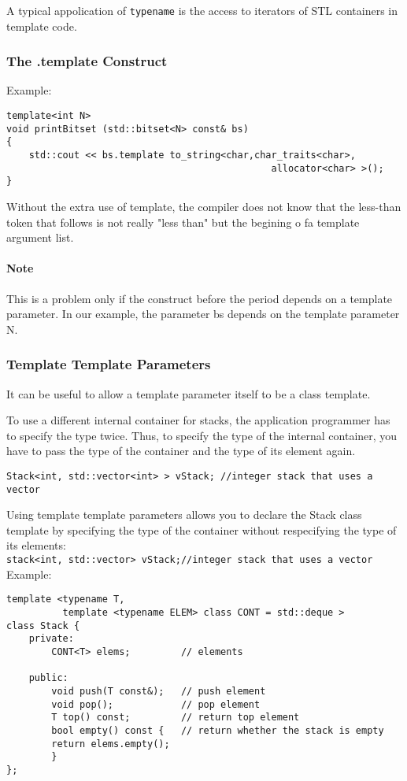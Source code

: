 \documentclass[11pt, a4paper]{book}
\begin{document}
A typical appolication of \verb|typename| is the access to iterators of STL containers in template code.

\subsubsection{The .template Construct}
Example:
\begin{verbatim}
template<int N> 
void printBitset (std::bitset<N> const& bs) 
{ 
    std::cout << bs.template to_string<char,char_traits<char>, 
	                                           allocator<char> >(); 
}
\end{verbatim}
Without the extra use of template, the compiler does not know that the less-than token that follows is not really "less than" but the begining o fa template argument list.
\paragraph{Note} This is a problem only if the construct before the period depends on a template parameter. In our example, the parameter bs depends on the template parameter N.
\subsubsection{Template Template Parameters}
It can be useful to allow a template parameter itself to be a class template. 

To use a different internal container for stacks, the application programmer has to specify the type twice. Thus, to specify the type of the internal container, you have to pass the type of the container and the type of its element again.
\begin{verbatim}
Stack<int, std::vector<int> > vStack; //integer stack that uses a vector
\end{verbatim}

Using template template parameters allows you to declare the Stack class template by specifying the type of the container without respecifying the type of its elements:\\
\verb|stack<int, std::vector> vStack;//integer stack that uses a vector|
Example:
\begin{verbatim}
template <typename T, 
          template <typename ELEM> class CONT = std::deque > 
class Stack { 
    private: 
        CONT<T> elems;         // elements 

    public: 
        void push(T const&);   // push element 
        void pop();            // pop element 
        T top() const;         // return top element 
        bool empty() const {   // return whether the stack is empty 
        return elems.empty(); 
        } 
}; 
\end{verbatim}
\end{document}
